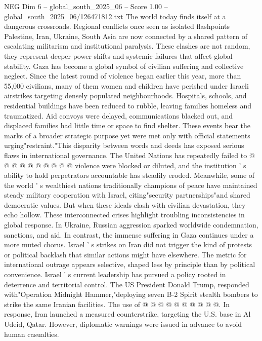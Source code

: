 \begin{textsample}{NEG Dim 6 – global\_south\_2025\_06 – Score 1.00 – global\_south\_2025\_06/126471812.txt}  \label{ex:f6_neg_429}
The world today finds itself at a dangerous crossroads.
Regional conflicts once seen as isolated flashpoints Palestine, Iran, Ukraine, South Asia are now connected by a shared pattern of escalating militarism and institutional paralysis.
These clashes are not random, they represent deeper power shifts and systemic failures that affect global stability.
Gaza has become a global symbol of civilian suffering and collective neglect.
Since the latest round of violence began earlier this year, more than 55,000 civilians, many of them women and children have perished under Israeli airstrikes targeting densely populated neighbourhoods.
Hospitals, schools, and residential buildings have been reduced to rubble, leaving families homeless and traumatized.
Aid convoys were delayed, communications blacked out, and displaced families had little time or space to find shelter.
These events bear the marks of a broader strategic purpose yet were met only with official statements urging"restraint."This disparity between words and deeds has exposed serious flaws in international governance.
The United Nations has repeatedly failed to @ @ @ @ @ @ @ @ @ @ violence were blocked or diluted, and the institution ' s ability to hold perpetrators accountable has steadily eroded.
Meanwhile, some of the world ' s wealthiest nations traditionally champions of peace have maintained steady military cooperation with Israel, citing"security partnerships"and shared democratic values.
But when these ideals clash with civilian devastation, they echo hollow.
These interconnected crises highlight troubling inconsistencies in global response.
In Ukraine, Russian aggression sparked worldwide condemnation, sanctions, and aid.
In contrast, the immense suffering in Gaza continues under a more muted chorus.
Israel ' s strikes on Iran did not trigger the kind of protests or political backlash that similar actions might have elsewhere.
The metric for international outrage appears selective, shaped less by principle than by political convenience.
Israel ' s current leadership has pursued a policy rooted in deterrence and territorial control.
The US President Donald Trump, responded with"Operation Midnight Hammer,"deploying seven B-2 Spirit stealth bombers to strike the same Iranian facilities.
The use of @ @ @ @ @ @ @ @ @ @.
In response, Iran launched a measured counterstrike, targeting the U.S. base in Al Udeid, Qatar.
However, diplomatic warnings were issued in advance to avoid human casualties.

\end{textsample}
